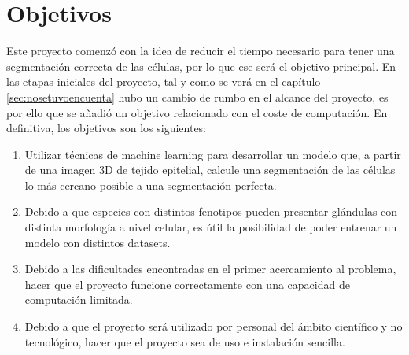 \chapter{Objetivos}

Este proyecto comenzó con la idea de reducir el tiempo necesario para tener una segmentación correcta de las células, por lo que ese será el objetivo principal. En las etapas iniciales del proyecto, tal y como se verá en el capítulo \ref{sec:nosetuvoencuenta} hubo un cambio de rumbo en el alcance del proyecto, es por ello que se añadió un objetivo relacionado con el coste de computación. En definitiva, los objetivos son los siguientes:

\begin{enumerate}
\item Utilizar técnicas de machine learning para desarrollar un modelo que, a partir de una imagen 3D de tejido epitelial, calcule una segmentación de las células lo más cercano posible a una segmentación perfecta.
\item Debido a que especies con distintos fenotipos pueden presentar glándulas con distinta morfología a nivel celular, es útil la posibilidad de poder entrenar un modelo con distintos datasets.
\item Debido a las dificultades encontradas en el primer acercamiento al problema, hacer que el proyecto funcione correctamente con una capacidad de computación limitada.
\item Debido a que el proyecto será utilizado por personal del ámbito científico y no tecnológico, hacer que el proyecto sea de uso e instalación sencilla.
\end{enumerate}